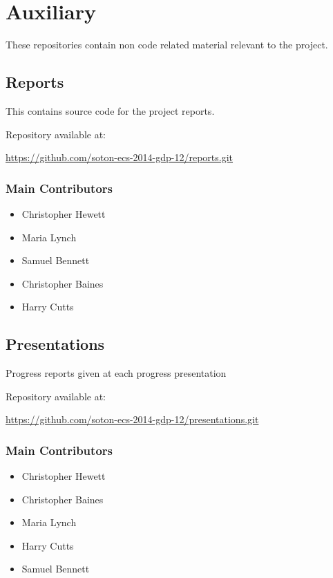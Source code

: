 \section{Auxiliary}

These repositories contain non code related material relevant to the project.

\subsection{Reports}
\label{Section:Repo_reports}

This contains source code for the project reports.

Repository available at:

\url{https://github.com/soton-ecs-2014-gdp-12/reports.git}

\subsubsection{Main Contributors}
\begin{itemize}
  \item Christopher Hewett
  \item Maria Lynch
  \item Samuel Bennett
  \item Christopher Baines  
  \item Harry Cutts
\end{itemize}

\subsection{Presentations}
\label{Section:Repo_presentations}

Progress reports given at each progress presentation

Repository available at:

\url{https://github.com/soton-ecs-2014-gdp-12/presentations.git}

\subsubsection{Main Contributors}
\begin{itemize}
  \item Christopher Hewett
  \item Christopher Baines
  \item Maria Lynch
  \item Harry Cutts
  \item Samuel Bennett
\end{itemize}

